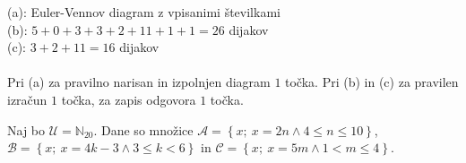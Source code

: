 \documentclass[addpoints,11pt]{exam}
\begin{document}
\begin{questions}

    \begin{solution}[8cm]
        (a): Euler-Vennov diagram z vpisanimi številkami \\
        (b): $5+0+3+3+2+11+1+1=26$ dijakov \\
        (c): $3+2+11=16$ dijakov \\ \\
        Pri (a) za pravilno narisan in izpolnjen diagram $1$ točka. Pri (b) in (c) za pravilen izračun $1$ točka, za zapis odgovora $1$ točka.
    \end{solution}




    \newpage

    \question
    Naj bo $\mathcal{U}=\mathbb{N}_{20}$. Dane so množice $\mathcal{A}=\left\{x;\ x=2n \land 4\leq n \leq10\right\}$, $\mathcal{B}=\left\{x;\ x=4k-3 \land 3\leq k< 6\right\}$ in $\mathcal{C}=\left\{x;\ x=5m \land 1<m\leq 4\right\}$. 


\end{questions}
\end{document}
